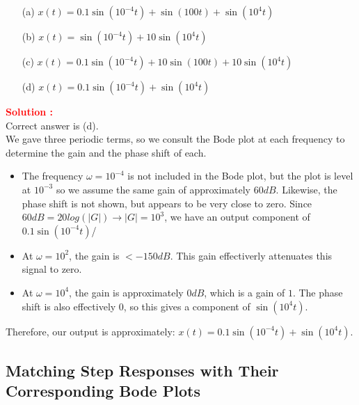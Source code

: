 \documentclass[12pt]{article}
\begin{document}
\begin{itemize}
    \item[(a)] \(x(t) = 0.1 \sin(10^{-4}t) + \sin(100t) + \sin(10^4t)\)
    \item[(b)] \(x(t) =  \sin(10^{-4}t) + 10 \sin(10^4t)\)
    \item[(c)] \(x(t) = 0.1 \sin(10^{-4}t) + 10\sin(100t) + 10 \sin(10^4t)\)
    \item[(d)] \(x(t) = 0.1 \sin(10^{-4}t) + \sin(10^4t)\)
\end{itemize}
\textbf{\textcolor{red}{Solution :}} \\
Correct answer is (d).\\
We gave three periodic terms, so we consult the Bode plot at each frequency to determine the gain and the phase shift of each.
\begin{itemize}
    \item The frequency \(\omega = 10^{-4}\) is not included in the Bode plot, but the plot is level at \(10^{-3}\) so we assume the same gain of approximately \(60 dB\). Likewise, the phase shift is not shown, but appears to be very close to zero. Since \(60 dB = 20log(|G|) \rightarrow |G| = 10^3\), we have an output component of \(0.1 \sin(10^{-4}t)\)/
    \item At \(\omega = 10^2\), the gain is \(<-150 dB\). This gain effectiverly attenuates this signal to zero.
    \item At \(\omega = 10^4\), the gain is approximately \(0 dB\), which is a gain of \(1\). The phase shift is also effectively \(0\), so this gives a component of \(\sin(10^4t)\).
\end{itemize}
Therefore, our output is approximately: \(x(t) = 0.1 \sin(10^{-4}t) + \sin(10^4t)\).
\clearpage

\subsection{Matching Step Responses with Their Corresponding Bode Plots}
\end{document}
